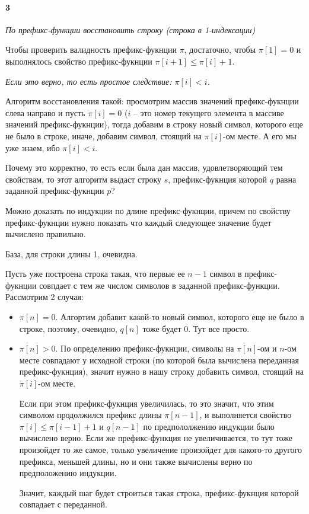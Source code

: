 \documentclass[russian]{article}
\begin{document}
\paragraph*{3}

\textit{По префикс-функции восстановить строку (строка в 1-индексации)}

Чтобы проверить валидность префикс-фукнции $\pi$, достаточно, чтобы $\pi[1]=0$ и выполнялось свойство префикс-фукнции $\pi[i+1] \leqslant \pi[i] + 1$.

\textit{Если это верно, то есть простое следствие: $\pi[i] < i$.}

Алгоритм восстановления такой: просмотрим массив значений префикс-фукнции слева направо и пусть $\pi[i] = 0$ ($i$ -- это номер текущего элемента в массиве значений префикс-фукнции), тогда добавим в строку новый символ, которого еще не было в строке, иначе, добавим символ, стоящий на $\pi[i]$-ом месте. А его мы уже знаем, ибо $\pi[i] < i$.

Почему это корректно, то есть если была дан массив, удовлетворяющий тем свойствам, то этот алгоритм выдаст строку $s$, префикс-фукнция которой $q$ равна заданной префикс-фукнции $p$?

Можно доказать по индукции по длине префикс-фукнции, причем по свойству префикс-фукнции нужно показать что каждый следующее значение будет вычислено правильно.

База, для строки длины 1, очевидна.

Пусть уже построена строка такая, что первые ее $n-1$ символ в префикс-фукнции совпдает с тем же числом символов в заданной префикс-функции. Рассмотрим 2 случая:
\begin{itemize}
\item $\pi[n] = 0$. Алгортим добавит какой-то новый символ, которого еще не было в строке, поэтому, очевидно, $q[n]$ тоже будет $0$. Тут все просто.
\item $\pi[n] > 0$. По определению префикс-фукнции, символы на $\pi[n]$-ом и $n$-ом месте совпадают у исходной строки (по которой была вычислена переданная префикс-фукнция), значит нужно в нашу строку добавить символ, стоящий на $\pi[i]$-ом месте.

Если при этом префикс-фукнция увеличилась, то это значит, что этим символом продолжился префикс длины $\pi[n-1]$, и выполняется свойство $\pi[i] \leqslant \pi[i-1] + 1$ и $q[n-1]$ по предпололжению индукции было вычислено верно.
Если же префикс-функция не увеличивается, то тут тоже произойдет то же самое, только увеличение произойдет для какого-то другого префикса, меньшей длины, но и они также вычислены верно по предположению индукции.

Значит, каждый шаг будет строиться такая строка, префикс-фукнция которой совпадает с переданной.

\end{itemize}
\end{document}
